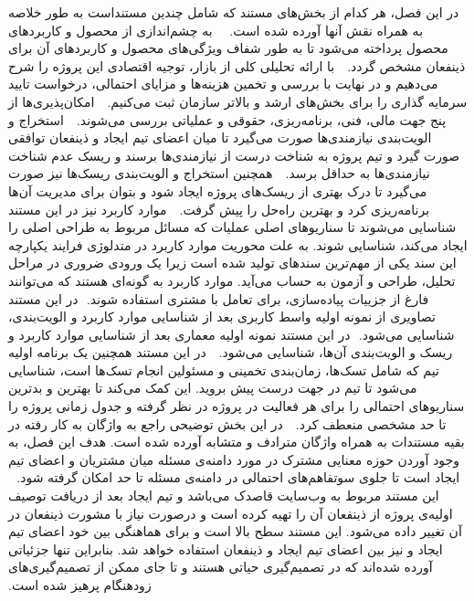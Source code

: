 ‫
‫
‫در این فصل، هر کدام از بخش‌های مستند که شامل چندین مستنداست به طور خلاصه به همراه نقش آنها آورده شده است.
‫
‫
‫‫
‫به چشم‌اندازی از محصول و کاربرد‌های محصول پرداخته می‌شود تا به طور شفاف ویژگی‌های محصول و کاربرد‌های آن برای ذینفعان مشخص گردد.
‫
‫‫
‫با ارائه تحلیلی کلی از بازار، توجیه اقتصادی این  پروژه را شرح می‌دهیم و در نهایت با بررسی و تخمین هزینه‌ها و مزایای احتمالی، درخواست تایید سرمایه گذاری را برای بخش‌های ارشد و بالاتر سازمان ثبت می‌کنیم.
‫
‫‫
‫امکان‌پذیری‌ها از پنج جهت مالی، فنی، برنامه‌ریزی، حقوقی و عملیاتی بررسی می‌شوند.
‫
‫
‫استخراج و الویت‌بندی نیازمندی‌‌ها صورت می‌گیرد تا میان اعضای تیم ایجاد و ذینفعان توافقی صورت گیرد و تیم پروژه به شناخت درست از نیازمندی‌ها برسند و ریسک عدم شناخت نیازمندی‌ها به حداقل برسد.
‫
‫‫
‫همچنین استخراج و الویت‌بندی ریسک‌ها نیز صورت می‌گیرد تا درک بهتری از ریسک‌های پروژه ایجاد شود و بتوان برای مدیریت آن‌ها برنامه‌ریزی کرد و بهترین راه‌حل را پیش گرفت. 
‫
‫‫‫
‫موارد کاربرد نیز در این مستند شناسایی می‌شوند تا سناریوهای اصلی عملیات که مسائل مربوط به طراحی اصلی را ایجاد می‌کند، شناسایی شوند. به علت محوریت موارد کاربرد در
‫متدلوژی فرایند یکپارچه این سند یکی از مهم‌ترین سند‌های تولید شده است زیرا یک ورودی ضروری در مراحل تحلیل، طراحی و آزمون به حساب می‌آید. موارد کاربرد به گونه‌ای هستند که می‌توانند فارغ از جزییات پیاده‌سازی، برای تعامل با مشتری استفاده شوند.
‫
‫در این مستند تصاویری از نمونه اولیه واسط کاربری بعد از شناسایی موارد کاربرد و الویت‌بندی، شناسایی می‌شود.
‫
‫در این مستند نمونه اولیه معماری بعد از شناسایی موارد کاربرد و ریسک و الویت‌بندی آن‌ها، شناسایی می‌شود.
‫
‫‫‫
‫در این مستند همچنین یک برنامه اولیه تیم که شامل تسک‌ها، زمان‌بندی تخمینی و مسئولین انجام تسک‌ها است، شناسایی می‌شود تا تیم در جهت درست پیش بروید. این کمک می‌کند تا بهترین و بدترین سناریوهای احتمالی را برای هر فعالیت در پروژه در نظر گرفته و جدول زمانی پروژه را تا حد مشخصی منعطف کرد.
‫
‫‫‫
‫در این بخش توضیحی راجع به واژگان به کار رفته در بقیه مستندات به همراه واژگان مترادف و متشابه آورده شده است. هدف این فصل، به وجود آوردن حوزه معنایی مشترک در مورد دامنه‌ی مسئله میان مشتریان و اعضای تیم ایجاد است تا جلوی سوتفاهم‌های احتمالی در دامنه‌ی مسئله تا حد امکان گرفته شود.
‫
‫
‫این مستند مربوط به وب‌سایت قاصدک می‌باشد و تیم ایجاد بعد از دریافت توصیف اولیه‌ی پروژه از ذینفعان آن را تهیه کرده است و درصورت نیاز با مشورت ذینفعان در آن تغییر داده می‌شود. این مستند سطح بالا است و برای هماهنگی بین خود اعضای تیم ایجاد و نیز بین اعضای تیم ایجاد و ذینفعان استفاده خواهد شد. بنابراین تنها جزئیاتی آورده شده‌اند که در تصمیم‌گیری حیاتی هستند و تا جای ممكن از تصمیم‌گیری‌های زودهنگام پرهیز شده است.
